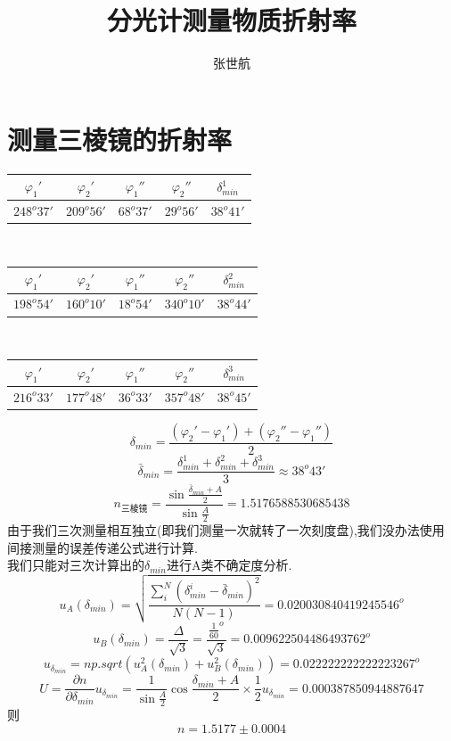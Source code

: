\documentclass[10pt, a4paper]{article}
\author{张世航}
\title{分光计测量物质折射率}
\begin{document}
	\maketitle
	\section{测量三棱镜的折射率}
	\begin{tabular}{|c|c|c|c|c|}
		\hline
		$\varphi_1'$&$\varphi_2'$  & $\varphi_1''$ & $\varphi_2''$&$\delta_{min}^1$ \\
		\hline
		$248^o37'$&$209^o56'$  & $68^o37'$ & $29^o56'$ &$ 38^o41'$\\
		\hline
	\end{tabular}\\
	
	\begin{tabular}{|c|c|c|c|c|}
		\hline
		$\varphi_1'$&$\varphi_2'$  & $\varphi_1''$ & $\varphi_2''$ &$\delta_{min}^2$\\
		\hline
		$198^o54'$&$160^o10'$  & $18^o54'$ & $340^o10'$ &$38^o44'$\\
		\hline
	\end{tabular}\\
	
	\begin{tabular}{|c|c|c|c|c|}
		\hline
		$\varphi_1'$&$\varphi_2'$  & $\varphi_1''$ & $\varphi_2''$ &$\delta_{min}^3$\\
		\hline
		$216^o33'$&$177^o48'$  & $36^o33'$ & $357^o48'$ &$38^o45'$\\
		\hline
	\end{tabular}
	
	\[\delta_{min} = \frac{(\varphi_2'-\varphi_1')+(\varphi_2''-\varphi_1'')}{2}\]
	\[\bar{\delta}_{min} = \frac{\delta_{min}^1+\delta_{min}^2+\delta_{min}^3}{3}\approx38^o43'\]
	\[n_{\text{三棱镜}} = \frac{\sin\frac{\bar{\delta}_{min}+A}{2}}{\sin\frac{A}{2}} =1.5176588530685438\]
	由于我们三次测量相互独立(即我们测量一次就转了一次刻度盘),我们没办法使用间接测量的误差传递公式进行计算.\\
	我们只能对三次计算出的$\delta_{min}$进行A类不确定度分析.\\
	\[u_A(\delta_{min}) = \sqrt{\frac{\sum_{i}^{N}(\delta_{min}^i-\bar{\delta}_{min})^2}{N(N-1)}}=0.020030840419245546^o\]
	\[u_B(\delta_{min}) = \frac{\Delta}{\sqrt{3}} = \frac{\frac{1}{60}^o}{\sqrt{3}} = 0.009622504486493762
	^o\]
	\[u_{\delta_{min}} = np.sqrt(u_A^2(\delta_{min})+u_B^2(\delta_{min})) = 0.022222222222223267^o\]
	\[U = \frac{\partial n}{\partial \delta_{min}}u_{\delta_{min}} = \frac{1}{\sin\frac{A}{2}}\cos\frac{\delta_{min}+A}{2}\times\frac{1}{2}u_{\delta_{min}} =0.000387850944887647\]
	则\[n = 1.5177\pm0.0004\]
\end{document}
